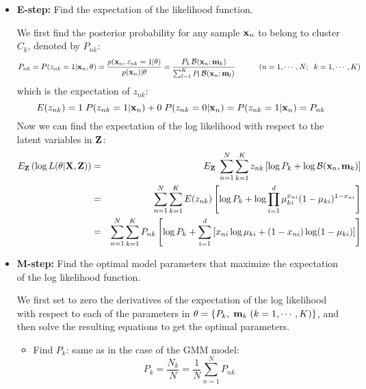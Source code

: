 \documentclass{article}
\begin{document}
\begin{itemize}
\item {\bf E-step:} Find the expectation of the likelihood function.
  
  We first find the posterior probability for any sample 
  ${\bf x}_n$ to belong to cluster $C_k$, denoted by $P_{nk}$:
  \begin{equation}
    P_{nk}=P(z_{nk}=1|{\bf x}_n,{\bf\theta})
    =\frac{p({\bf x}_n,z_{nk}=1|{\bf\theta})}{p({\bf x}_n)|{\bf\theta}}
    =\frac{P_k\,{\cal B}({\bf x}_n;{\bf m}_k)}
    {\sum_{l=1}^K P_l\,{\cal B}({\bf x}_n;{\bf m}_l)}
    \;\;\;\;\;\;\;\;\;\;\;(n=1,\cdots,N;\;\;k=1,\cdots,K)
  \end{equation}
  which is the expectation of $z_{nk}$:
  \begin{equation}
    E(z_{nk})=1\;P(z_{nk}=1|{\bf x}_n)+0\;P(z_{nk}=0|{\bf x}_n)
    =P(z_{nk}=1|{\bf x}_n)=P_{nk}
  \end{equation}
  Now we can find the expectation of the log likelihood with respect to 
  the latent variables in ${\bf Z}$:
  \begin{eqnarray}
    E_{\bf Z} \left(\log L({\bf\theta}|{\bf X},{\bf Z})\right)
    &=&E_{\bf Z}\;\sum_{n=1}^N \sum_{k=1}^K z_{nk}\left[\log P_k
      +\log {\cal B}({\bf x}_n,{\bf m}_k)\right]
    \nonumber\\
    &=&\sum_{n=1}^N \sum_{k=1}^K E(z_{nk}) \left[\log P_k
      +\log \prod_{i=1}^d \mu_{ki}^{x_{ni}} (1-\mu_{ki})^{1-x_{ni}} \right]
    \nonumber\\
    &=&\sum_{n=1}^N \sum_{k=1}^K P_{nk}   \left[\log P_k
      +\sum_{i=1}^d \left[ x_{ni}\log\mu_{ki}+(1-x_{ni})\log(1-\mu_{ki}) \right]\right]
  \end{eqnarray}

\item {\bf M-step:} Find the optimal model parameters that maximize 
  the expectation of the log likelihood function.

  We first set to zero the derivatives of the expectation of 
  the log likelihood with respect to each of the parameters in 
  ${\bf\theta}=\{P_k,\;{\bf m}_k\;(k=1,\cdots,K)\}$, and then solve
  the resulting equations to get the optimal parameters.

  \begin{itemize}
  \item Find $P_k$: same as in the case of the GMM model:
    \begin{equation}
      P_k=\frac{N_k}{N}=\frac{1}{N}\sum_{n=1}^N P_{nk}
    \end{equation}


\end{itemize}
\end{itemize}
\end{document}
